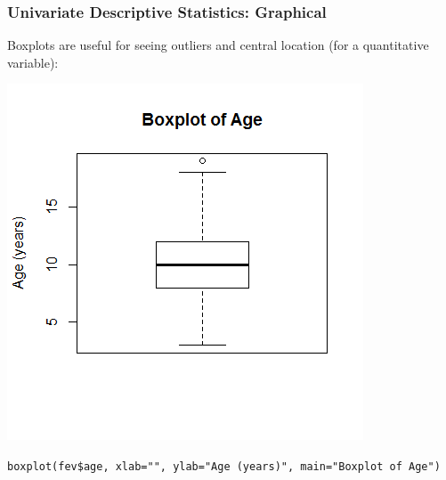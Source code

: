 \documentclass[12pt, 
hyperref={colorlinks=true, linkcolor=blue, urlcolor=cyan}]{beamer}
\begin{document}
\begin{frame}
\frametitle{Univariate Descriptive Statistics: Graphical}

Boxplots are useful for seeing outliers and central location (for a quantitative variable):\vspace{-0.8cm}

\center \includegraphics[height=0.7\textheight]{./boxplot-age}

\vspace{-1cm} \begin{scriptsize} \texttt{boxplot(fev\$age, xlab="", ylab="Age (years)", main="Boxplot of Age")} \end{scriptsize}

\end{frame}
\end{document}
